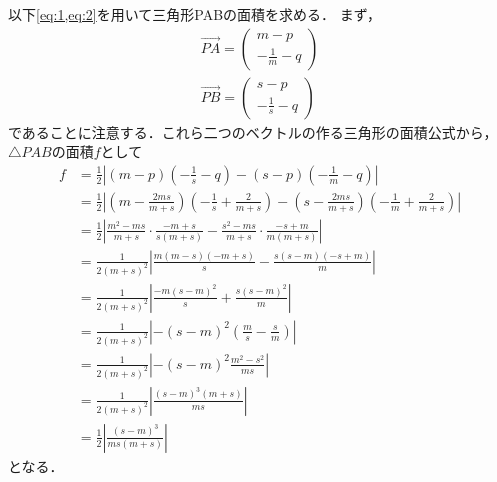 \documentclass[a4paper,10pt]{ltjsarticle}
\begin{document}
\begin{multicols}{2}
  以下\cref{eq:1,eq:2}を用いて三角形PABの面積を求める．
  まず，
  \begin{align*}
    \vec{PA} = \begin{pmatrix} m - p \\ -\frac{1}{m} - q \end{pmatrix} \\
    \vec{PB} = \begin{pmatrix} s - p \\ -\frac{1}{s} - q \end{pmatrix}
  \end{align*}
  であることに注意する．これら二つのベクトルの作る三角形の面積公式から，
  $\triangle PAB$の面積$f$として
  \begin{align}
    f
     & = \frac{1}{2} \left| (m-p)\left(-\frac{1}{s}-q\right) - (s-p)\left(-\frac{1}{m}-q\right) \right|  \nonumber                                                                         \\
     & = \frac{1}{2} \left| \left(m-\frac{2ms}{m+s}\right)\left(-\frac{1}{s}+\frac{2}{m+s}\right) - \left(s-\frac{2ms}{m+s}\right)\left(-\frac{1}{m}+\frac{2}{m+s}\right) \right|\nonumber \\
     & = \frac{1}{2} \left| \frac{m^2-ms}{m+s} \cdot \frac{-m+s}{s(m+s)} - \frac{s^2-ms}{m+s} \cdot \frac{-s+m}{m(m+s)} \right|     \nonumber                                              \\
     & = \frac{1}{2(m+s)^2} \left| \frac{m(m-s)(-m+s)}{s} - \frac{s(s-m)(-s+m)}{m} \right|           \nonumber                                                                             \\
     & = \frac{1}{2(m+s)^2} \left| \frac{-m(s-m)^2}{s} + \frac{s(s-m)^2}{m} \right|                           \nonumber                                                                    \\
     & = \frac{1}{2(m+s)^2} \left| -(s-m)^2 \left( \frac{m}{s} - \frac{s}{m} \right) \right|                           \nonumber                                                           \\
     & = \frac{1}{2(m+s)^2} \left| -(s-m)^2 \frac{m^2-s^2}{ms} \right|                                                          \nonumber                                                  \\
     & = \frac{1}{2(m+s)^2} \left|\frac{(s-m)^3 (m+s)}{ms}        \right|                                                                \nonumber                                         \\
     & = \frac{1}{2} \left|\frac{(s-m)^3}{ms(m+s)}  \right| \label{eq:3}
  \end{align}
  となる．


\end{multicols}
\end{document}
